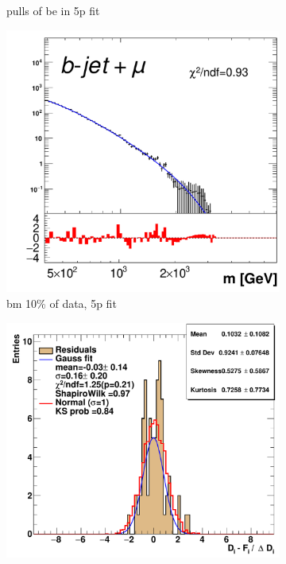 \begin{figure}[H]
\begin{subfigure}[h]{0.4\linewidth}
    \caption{pulls of be in 5p fit}
    \end{subfigure}
    \hfill
    \begin{subfigure}[h]{0.38\linewidth}
    \includegraphics[scale=0.3]{figs/app/10data/pub_mass_10per_extrapolate_bm.pdf}%
     \caption{bm 10\% of data, 5p fit}
     \end{subfigure}
     \hfill
    \begin{subfigure}[h]{0.4\linewidth}
    \includegraphics[scale=0.32]{figs/app/10data/pub_mass_10per_extrapolate_residuals_bm.pdf}%

\end{subfigure}
\end{figure}
